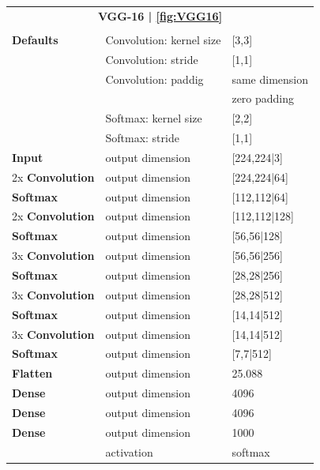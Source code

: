 \begin{tabularx}{\textwidth}{X X X}
	\multicolumn{3}{c}{\textbf{VGG-16 | \ref{fig:VGG16}}}\\
	\\
	\hline
	\endhead
	\textbf{Defaults} & Convolution: kernel size & [3,3]\\
	& Convolution: stride & [1,1]\\
	& Convolution: paddig & same dimension\\
	& & zero padding\\
	& Softmax: kernel size & [2,2]\\
	& Softmax: stride & [1,1]\\
	\hline
	\textbf{Input} & output dimension & [224,224|3]\\
	[8pt]
	2x \textbf{Convolution} & output dimension & [224,224|64]\\
	[8pt]
	\textbf{Softmax} & output dimension & [112,112|64]\\
	[8pt]
	2x \textbf{Convolution} & output dimension & [112,112|128]\\
	[8pt]
	\textbf{Softmax} & output dimension & [56,56|128]\\
	[8pt]
	3x \textbf{Convolution} & output dimension & [56,56|256]\\
	[8pt]
	\textbf{Softmax} & output dimension & [28,28|256]\\
	[8pt]
	3x \textbf{Convolution} & output dimension & [28,28|512]\\
	[8pt]
	\textbf{Softmax} & output dimension & [14,14|512]\\
	[8pt]
	3x \textbf{Convolution} & output dimension & [14,14|512]\\
	[8pt]
	\textbf{Softmax} & output dimension & [7,7|512]\\
	[8pt]
	\textbf{Flatten} & output dimension & 25.088\\
	[8pt]
	\textbf{Dense} & output dimension & 4096\\
	[8pt]
	\textbf{Dense} & output dimension & 4096\\
	[8pt]
	\textbf{Dense} & output dimension & 1000\\
	& activation & softmax\\
	\hline
\end{tabularx}


